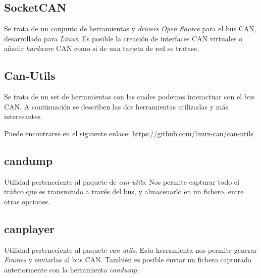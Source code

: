 \subsection{SocketCAN\cite{socket:can}}\label{socketcan}

Se trata de un conjunto de herramientas y \emph{drivers} \emph{Open Source} para el bus CAN, desarrollado para \emph{Linux}. Es posible la creación de interfaces CAN virtuales o añadir \emph{hardware} CAN como si de una tarjeta de red se tratase.


\subsection{Can-Utils}\label{can-utils}

Se trata de un set de herramientas con las cuales podemos interactuar con el bus CAN. A continuación se describen las dos herramientas utilizadas y más interesantes.

Puede encontrarse en el siguiente enlace:
\url{https://github.com/linux-can/can-utils}

\subsection{candump}\label{candump-utils}

Utilidad perteneciente al paquete de \emph{can-utils}. Nos permite capturar todo el tráfico que es transmitido a través del bus, y almacenarlo en un fichero, entre otras opciones.

\subsection{canplayer}\label{canplayer}

Utilidad perteneciente al paquete \emph{can-utils}. Esta herramienta nos permite generar \emph{Frames} y enviarlas al bus CAN. También es posible enviar un fichero capturado anteriormente con la herramienta \emph{candump}.




